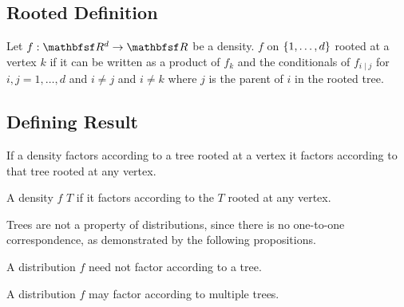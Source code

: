 
\sbasic





























\sstart
{}



\subsection{Rooted Definition}

Let $f: \R^d \to \R$ be a density.
$f$
on $\{1, \dots, d\}$ rooted
at a vertex $k$ if it can be
written as a product of $f_k$
and the conditionals of $f_{i \mid j}$
for $i,j = 1, \dots, d$ and $i \neq j$
and $i \neq k$ where $j$ is the parent
of $i$ in the rooted tree.

\subsection{Defining Result}
\begin{prop}
If a density factors according
to a tree rooted at a vertex it
factors according to that tree rooted
at any vertex.
\end{prop}


A density $f$
 $T$
if it factors according to the
$T$ rooted at any vertex.


Trees are not a property of distributions,
since there is no one-to-one correspondence,
as demonstrated by the following propositions.


A distribution $f$ need not factor according to a tree.

A distribution
$f$ may factor according to multiple trees.
\strats
